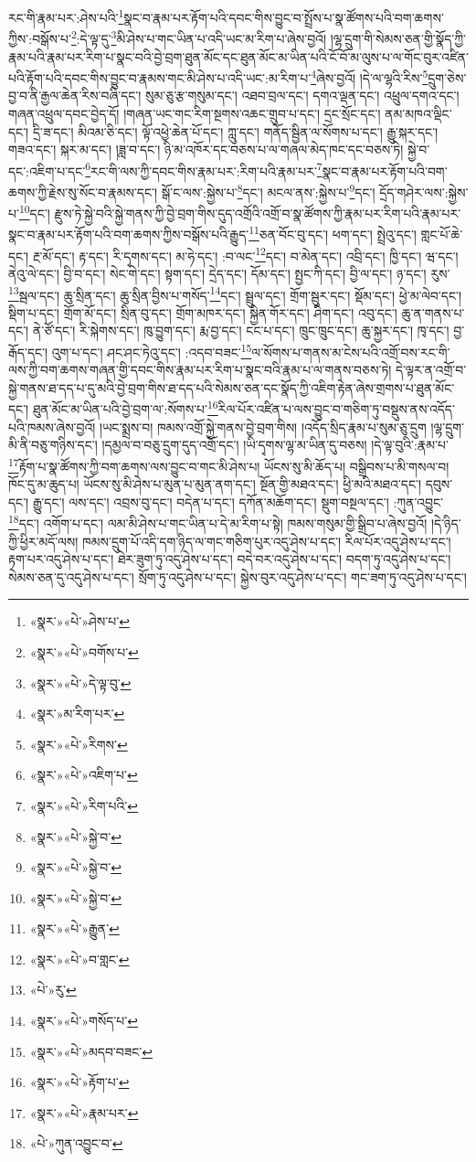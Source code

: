 རང་གི་རྣམ་པར་:ཤེས་པའི་\footnote{«སྣར་»«པེ་»ཤེས་པ་}སྣང་བ་རྣམ་པར་རྟོག་པའི་དབང་གིས་བྱུང་བ་སྤྲོས་པ་སྣ་ཚོགས་པའི་བག་ཆགས་ཀྱིས་:བསྒོས་པ་\footnote{«སྣར་»«པེ་»བགོས་པ་}:དེ་ལྟ་དུ་\footnote{«སྣར་»«པེ་»དེ་ལྟ་བུ་}མི་ཤེས་པ་གང་ཡིན་པ་འདི་ཡང་མ་རིག་པ་ཞེས་བྱའོ། །ལྷ་དྲུག་གི་སེམས་ཅན་གྱི་སྣོད་ཀྱི་རྣམ་པའི་རྣམ་པར་རིག་པ་སྣང་བའི་བྱེ་བྲག་ཐུན་མོང་དང་ཐུན་མོང་མ་ཡིན་པའི་ངོ་བོ་མ་ལུས་པ་ལ་གོང་བུར་འཛིན་པའི་རྟོག་པའི་དབང་གིས་བྱུང་བ་རྣམས་གང་མི་ཤེས་པ་འདི་ཡང་:མ་རིག་པ་\footnote{«སྣར་»མ་རིག་པར་}ཞེས་བྱའོ། །དེ་ལ་ལྷའི་རིས་\footnote{«སྣར་»«པེ་»རིགས་}དྲུག་ཅེས་བྱ་བ་ནི་རྒྱལ་ཆེན་རིས་བཞི་དང་། སུམ་ཅུ་རྩ་གསུམ་དང་། འཐབ་བྲལ་དང་། དགའ་ལྡན་དང་། འཕྲུལ་དགའ་དང་། གཞན་འཕྲུལ་དབང་བྱེད་དོ། །གཞན་ཡང་གང་རིག་སྔགས་འཆང་གྲུབ་པ་དང་། དྲང་སྲོང་དང་། ནམ་མཁའ་ལྡིང་དང་། དྲི་ཟ་དང་། མིའམ་ཅི་དང་། ལྟོ་འཕྱེ་ཆེན་པོ་དང་། ཀླུ་དང་། གནོད་སྦྱིན་ལ་སོགས་པ་དང་། རྒྱུ་སྐར་དང་། གཟའ་དང་། སྐར་མ་དང་། །ཟླ་བ་དང་། ཉི་མ་འཁོར་དང་བཅས་པ་ལ་གཞལ་མེད་ཁང་དང་བཅས་ཏེ། སྐྱེ་བ་དང་:འཇིག་པ་དང་\footnote{«སྣར་»«པེ་»འཇིག་པ་}རང་གི་ལས་ཀྱི་དབང་གིས་རྣམ་པར་:རིག་པའི་རྣམ་པར་\footnote{«སྣར་»«པེ་»རིག་པའི་}སྣང་བ་རྣམ་པར་རྟོག་པའི་བག་ཆགས་ཀྱི་རྗེས་སུ་སོང་བ་རྣམས་དང་། སྒོ་ང་ལས་:སྐྱེས་པ་\footnote{«སྣར་»«པེ་»སྐྱེ་བ་}དང་། མངལ་ནས་:སྐྱེས་པ་\footnote{«སྣར་»«པེ་»སྐྱེ་བ་}དང་། དྲོད་གཤེར་ལས་:སྐྱེས་པ་\footnote{«སྣར་»«པེ་»སྐྱེ་བ་}དང་། རྫུས་ཏེ་སྐྱེ་བའི་སྐྱེ་གནས་ཀྱི་བྱེ་བྲག་གིས་དུད་འགྲོའི་འགྲོ་བ་སྣ་ཚོགས་ཀྱི་རྣམ་པར་རིག་པའི་རྣམ་པར་སྣང་བ་རྣམ་པར་རྟོག་པའི་བག་ཆགས་ཀྱིས་བསྒོས་པའི་རྒྱུད་\footnote{«སྣར་»«པེ་»རྒྱུན་}ཅན་བོང་བུ་དང་། ཕག་དང་། སྤྲེའུ་དང་། གླང་པོ་ཆེ་དང་། རྔ་མོ་དང་། རྟ་དང་། རི་དྭགས་དང་། མ་ཧེ་དང་། :བ་ལང་\footnote{«སྣར་»«པེ་»བ་གླང་}དང་། བ་མེན་དང་། འབྲི་དང་། ཁྱི་དང་། ཝ་དང་། ནེའུ་ལེ་དང་། བྱི་བ་དང་། སེང་གེ་དང་། སྟག་དང་། དྲེད་དང་། དོམ་དང་། སྤྱང་ཀི་དང་། བྱི་ལ་དང་། ཉ་དང་། རུས་\footnote{«པེ་»རུ་}སྦལ་དང་། ཆུ་སྲིན་དང་། ཆུ་སྲིན་བྱིས་པ་གསོད་\footnote{«སྣར་»«པེ་»གསོད་པ་}དང་། སྦྲུལ་དང་། གྲོག་སྦུར་དང་། སྡོམ་དང་། ཕྱེ་མ་ལེབ་དང་། སྡིག་པ་དང་། གྲོག་མོ་དང་། སྲིན་བུ་དང་། གྲོག་མཁར་དང་། སྐྱིན་གོར་དང་། ཤིག་དང་། འབུ་དང་། ཆུ་ན་གནས་པ་དང་། ནེ་ཙོ་དང་། རི་སྐེགས་དང་། ཁུ་བྱུག་དང་། རྨ་བྱ་དང་། ངང་པ་དང་། ཁྲུང་ཁྲུང་དང་། ཆུ་སྐྱར་དང་། ཁྭ་དང་། བྱ་རྒོད་དང་། འུག་པ་དང་། ཤང་ཤང་ཏེའུ་དང་། :འདབ་བཟང་\footnote{«སྣར་»«པེ་»མདབ་བཟང་}ལ་སོགས་པ་གནས་མ་ངེས་པའི་འགྲོ་བས་རང་གི་ལས་ཀྱི་བག་ཆགས་གཞན་གྱི་དབང་གིས་རྣམ་པར་རིག་པ་སྣང་བའི་རྣམ་པ་ལ་གནས་བཅས་ཏེ། དེ་ལྟར་ན་འགྲོ་བ་སྐྱེ་གནས་ཐ་དད་པ་དུ་མའི་བྱེ་བྲག་གིས་ཐ་དད་པའི་སེམས་ཅན་དང་སྣོད་ཀྱི་འཇིག་རྟེན་ཞེས་གྲགས་པ་ཐུན་མོང་དང་། ཐུན་མོང་མ་ཡིན་པའི་བྱེ་བྲག་ལ་:སོགས་པ་\footnote{«སྣར་»«པེ་»རྟོག་པ་}རིལ་པོར་འཛིན་པ་ལས་བྱུང་བ་གཅིག་ཏུ་བསྡུས་ནས་འདོད་པའི་ཁམས་ཞེས་བྱའོ། །ཡང་སྨྲས་བ། ཁམས་འགྲོ་སྐྱེ་གནས་བྱེ་བྲག་གིས། །འདོད་སྲིད་རྣམ་པ་སུམ་ཅུ་དྲུག །ལྷ་དྲུག་མི་ནི་བཅུ་གཉིས་དང་། །དམྱལ་བ་བཅུ་དྲུག་དུད་འགྲོ་དང་། །ཡི་དྭགས་ལྷ་མ་ཡིན་དུ་བཅས། །དེ་ལྟ་བུའི་:རྣམ་པ་\footnote{«སྣར་»«པེ་»རྣམ་པར་}རྟོག་པ་སྣ་ཚོགས་ཀྱི་བག་ཆགས་ལས་བྱུང་བ་གང་མི་ཤེས་པ། ཡོངས་སུ་མི་ཆོད་པ། བསྒྲིབས་པ་མི་གསལ་བ། ཁོང་དུ་མ་ཆུད་པ། ཡོངས་སུ་མི་ཤེས་པ་མུན་པ་མུན་ནག་དང་། སྔོན་གྱི་མཐའ་དང་། ཕྱི་མའི་མཐའ་དང་། དབུས་དང་། རྒྱུ་དང་། ལས་དང་། འབྲས་བུ་དང་། བདེན་པ་དང་། དཀོན་མཆོག་དང་། སྡུག་བསྔལ་དང་། :ཀུན་འབྱུང་\footnote{«པེ་»ཀུན་འབྱུང་བ་}དང་། འགོག་པ་དང་། ལམ་མི་ཤེས་པ་གང་ཡིན་པ་དེ་མ་རིག་པ་སྟེ། ཁམས་གསུམ་གྱི་སྒྲིབ་པ་ཞེས་བྱའོ། །དེ་ཉིད་ཀྱི་ཕྱིར་མདོ་ལས། ཁམས་དྲུག་པོ་འདི་དག་ཉིད་ལ་གང་གཅིག་པུར་འདུ་ཤེས་པ་དང་། རིལ་པོར་འདུ་ཤེས་པ་དང་། རྟག་པར་འདུ་ཤེས་པ་དང་། ཐེར་ཟུག་ཏུ་འདུ་ཤེས་པ་དང་། བདེ་བར་འདུ་ཤེས་པ་དང་། བདག་ཏུ་འདུ་ཤེས་པ་དང་། སེམས་ཅན་དུ་འདུ་ཤེས་པ་དང་། སྲོག་ཏུ་འདུ་ཤེས་པ་དང་། སྐྱེས་བུར་འདུ་ཤེས་པ་དང་། གང་ཟག་ཏུ་འདུ་ཤེས་པ་དང་། 